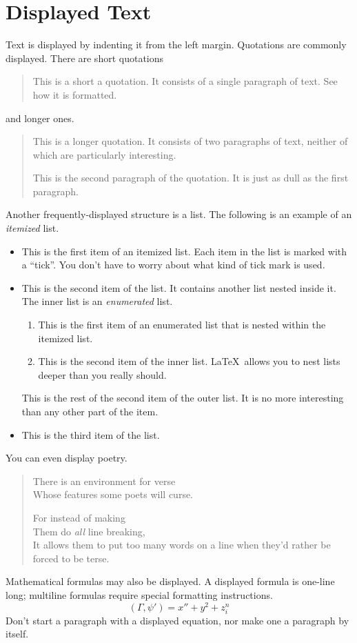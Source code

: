 \documentclass{article}      %
\newcommand{\ip}[2]{(#1, #2)}
\begin{document}
\section{Displayed Text}

Text is displayed by indenting it from the left
margin.  Quotations are commonly displayed.  There
are short quotations
\begin{quote}
   This is a short a quotation.  It consists of a 
   single paragraph of text.  See how it is formatted.
\end{quote}
and longer ones.
\begin{quotation}
   This is a longer quotation.  It consists of two
   paragraphs of text, neither of which are
   particularly interesting.

   This is the second paragraph of the quotation.  It
   is just as dull as the first paragraph.
\end{quotation}
Another frequently-displayed structure is a list.
The following is an example of an \emph{itemized}
list.
\begin{itemize}
   \item This is the first item of an itemized list.
         Each item in the list is marked with a ``tick''.
         You don't have to worry about what kind of tick
         mark is used.

   \item This is the second item of the list.  It
         contains another list nested inside it.  The inner
         list is an \emph{enumerated} list.
         \begin{enumerate}
            \item This is the first item of an enumerated 
                  list that is nested within the itemized list.

            \item This is the second item of the inner list.  
                  \LaTeX\ allows you to nest lists deeper than 
                  you really should.
         \end{enumerate}
         This is the rest of the second item of the outer
         list.  It is no more interesting than any other
         part of the item.
   \item This is the third item of the list.
\end{itemize}
You can even display poetry.
\begin{verse}
   There is an environment 
    for verse \\             %
   Whose features some poets %
   will curse.   


   For instead of making\\
   Them do \emph{all} line breaking, \\
   It allows them to put too many words on a line when they'd rather be 
   forced to be terse.
\end{verse}

Mathematical formulas may also be displayed.  A
displayed formula 
is 
one-line long; multiline
formulas require special formatting instructions.
   \[  \ip{\Gamma}{\psi'} = x'' + y^{2} + z_{i}^{n}\]
Don't start a paragraph with a displayed equation,
nor make one a paragraph by itself.
\end{document}
